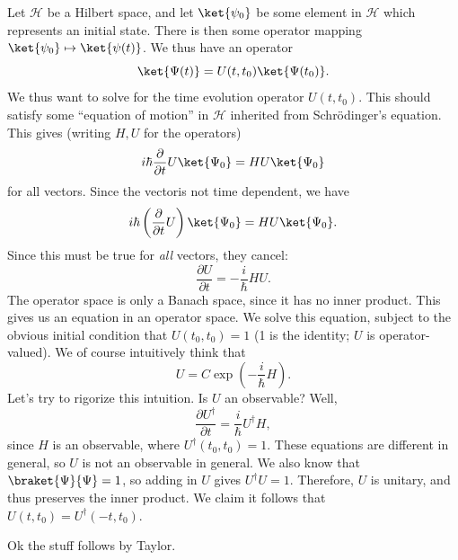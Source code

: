 
Let $\mathcal{H} $ be a Hilbert space, and let $\ket{\psi _0}$ be some element in $\mathcal{H} $ which represents an initial state. There is then some operator mapping $\ket{\psi _0}\mapsto \ket{\psi (t)}$. We thus have an operator
\[
	\ket{\Psi (t)} = U(t,t_0)\ket{\Psi (t_0)}
.\]
We thus want to solve for the time evolution operator $U(t,t_0)$. This should satisfy some ``equation of motion'' in $\mathcal{H} $ inherited from Schr\"odinger's equation. This gives (writing $H,U$ for the operators)
\[
	i\hbar \frac{\partial }{\partial t} U\ket{\Psi _0} = HU\ket{\Psi _0}
\]
for all vectors. Since the vectoris not time dependent, we have 
\[
	i\hbar \left(\frac{\partial }{\partial t} U\right)\ket{\Psi _0}= HU\ket{\Psi_0}
.\]
Since this must be true for \emph{all} vectors, they cancel:
\[
	\frac{\partial U}{\partial t} =-\frac{i}{\hbar} HU
.\]
The operator space is only a Banach space, since it has no inner product. This gives us an equation in an operator space. We solve this equation, subject to the obvious initial condition that $U(t_0,t_0)=1$ (1 is the identity; $U$ is operator-valued). We of course intuitively think that
\[
	U = C\exp \left( - \frac{i}{\hbar} H \right) 
.\]
Let's try to rigorize this intuition. Is $U$ an observable? Well,
\[
	\frac{\partial U^\dagger}{\partial t} =\frac{i}{\hbar} U^\dagger H,
\]
since $H$ is an observable, where $U^\dagger(t_0,t_0)=1$. These equations are different in general, so $U$ is not an observable in general. We also know that $\braket{\Psi }{\Psi }=1$, so adding in $U$ gives $U^\dagger U=1$. Therefore, $U$ is unitary, and thus preserves the inner product. We claim it follows that $U(t,t_0)=U^\dagger(-t,t_0)$.

Ok the stuff follows by Taylor.
